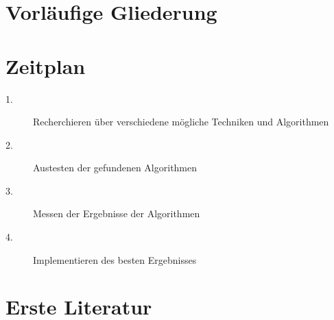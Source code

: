 \begin{onehalfspace}
\section{Vorläufige Gliederung}

\section{Zeitplan}

\begin{description}
	\item[1.]
	Recherchieren über verschiedene mögliche Techniken und Algorithmen
	\item[2.] 
	Austesten der gefundenen Algorithmen
	\item[3.]
	Messen der Ergebnisse der Algorithmen
	\item[4.] Implementieren des besten Ergebnisses
\end{description}

\section{Erste Literatur}
\end{onehalfspace}